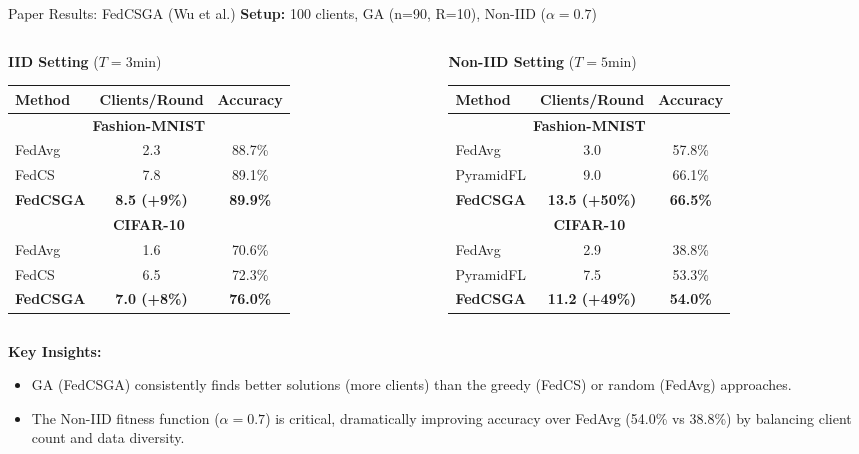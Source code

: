 \documentclass{beamer}
\begin{document}
\begin{frame}{Paper Results: FedCSGA (Wu et al.)}
\textbf{Setup:} 100 clients, GA (n=90, R=10), Non-IID ($\alpha=0.7$)

\begin{columns}[T]
\begin{column}{0.5\textwidth}
\textbf{IID Setting} ($T=3$min)
\begin{table}
\centering
\tiny
\begin{tabular}{lcc}
\toprule
Method & Clients/Round & Accuracy \\
\midrule
\multicolumn{3}{c}{\textbf{Fashion-MNIST}} \\
FedAvg & 2.3 & 88.7\% \\
FedCS & 7.8 & 89.1\% \\
\textbf{FedCSGA} & \textbf{8.5 (+9\%)} & \textbf{89.9\%} \\
\midrule
\multicolumn{3}{c}{\textbf{CIFAR-10}} \\
FedAvg & 1.6 & 70.6\% \\
FedCS & 6.5 & 72.3\% \\
\textbf{FedCSGA} & \textbf{7.0 (+8\%)} & \textbf{76.0\%} \\
\bottomrule
\end{tabular}
\end{table}
\end{column}

\begin{column}{0.5\textwidth}
\textbf{Non-IID Setting} ($T=5$min)
\begin{table}
\centering
\tiny
\begin{tabular}{lcc}
\toprule
Method & Clients/Round & Accuracy \\
\midrule
\multicolumn{3}{c}{\textbf{Fashion-MNIST}} \\
FedAvg & 3.0 & 57.8\% \\
PyramidFL & 9.0 & 66.1\% \\
\textbf{FedCSGA} & \textbf{13.5 (+50\%)} & \textbf{66.5\%} \\
\midrule
\multicolumn{3}{c}{\textbf{CIFAR-10}} \\
FedAvg & 2.9 & 38.8\% \\
PyramidFL & 7.5 & 53.3\% \\
\textbf{FedCSGA} & \textbf{11.2 (+49\%)} & \textbf{54.0\%} \\
\bottomrule
\end{tabular}
\end{table}
\end{column}
\end{columns}

\vspace{0.3cm}
\textbf{Key Insights:}
\begin{itemize}
    \item GA (FedCSGA) consistently finds better solutions (more clients) than the greedy (FedCS) or random (FedAvg) approaches.
    \item The Non-IID fitness function ($\alpha=0.7$) is critical, dramatically improving accuracy over FedAvg (54.0\% vs 38.8\%) by balancing client count and data diversity.
\end{itemize}
\end{frame}
\end{document}

